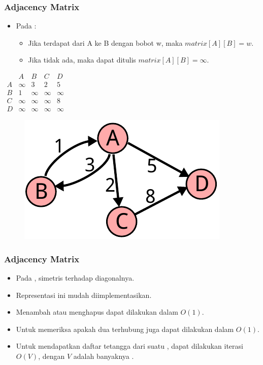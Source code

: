 \begin{frame}
\frametitle{Adjacency Matrix}
\begin{itemize}
  \item Pada  \fgraph:
  \begin{itemize}
    \item Jika terdapat \fedge dari A ke B dengan bobot w, maka $matrix[A][B] = w$. 
    \item Jika tidak ada, maka dapat ditulis $matrix[A][B] = \infty$.
  \end{itemize}
\end{itemize}

\begin{center}
\begin{multicols}{2}
  $\begin{array}{c|cccc}
      & A & B & C & D \\ \hline
    A & \infty & 3 & 2 & 5 \\
    B & 1 & \infty & \infty & \infty \\
    C & \infty & \infty & \infty & 8 \\
    D & \infty & \infty & \infty & \infty
  \end{array}$
  \break
  \begin{figure}
    \includegraphics[width=4 cm]{asset/weighted-directed.pdf}
  \end{figure}
\end{multicols} 
\end{center}
\end{frame}

\begin{frame}
\frametitle{Adjacency Matrix}
\begin{itemize}
  \item Pada  \fgraph, \fadjacencymatrix simetris terhadap diagonalnya.
  \item Representasi ini mudah diimplementasikan.
  \item Menambah atau menghapus \fedge dapat dilakukan dalam $O(1)$.
  \item Untuk memeriksa apakah dua \fnode terhubung juga dapat dilakukan dalam $O(1)$.
  \item Untuk mendapatkan daftar tetangga dari suatu \fnode, dapat dilakukan iterasi $O(V)$, dengan $V$ adalah banyaknya \fnode.
\end{itemize}
\end{frame}

